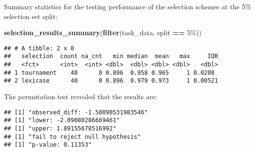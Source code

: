 \documentclass[
]{book}
\newenvironment{Shaded}{\begin{snugshade}}{\end{snugshade}}
\newcommand{\AttributeTok}[1]{\textcolor[rgb]{0.13,0.29,0.53}{#1}}
\newcommand{\DecValTok}[1]{\textcolor[rgb]{0.00,0.00,0.81}{#1}}
\newcommand{\FunctionTok}[1]{\textcolor[rgb]{0.13,0.29,0.53}{\textbf{#1}}}
\newcommand{\NormalTok}[1]{#1}
\newcommand{\OtherTok}[1]{\textcolor[rgb]{0.56,0.35,0.01}{#1}}
\newcommand{\SpecialCharTok}[1]{\textcolor[rgb]{0.81,0.36,0.00}{\textbf{#1}}}
\newcommand{\StringTok}[1]{\textcolor[rgb]{0.31,0.60,0.02}{#1}}
\begin{document}
Summary statistics for the testing performance of the selection schemes at the 5\% selection set split:

\begin{Shaded}
\begin{Highlighting}[]
\FunctionTok{selection\_results\_summary}\NormalTok{(}\FunctionTok{filter}\NormalTok{(task\_data, split }\SpecialCharTok{==} \StringTok{\textquotesingle{}5\%\textquotesingle{}}\NormalTok{))}
\end{Highlighting}
\end{Shaded}

\begin{verbatim}
## # A tibble: 2 x 8
##   selection  count na_cnt   min median  mean   max     IQR
##   <fct>      <int>  <int> <dbl>  <dbl> <dbl> <dbl>   <dbl>
## 1 tournament    40      0 0.896  0.958 0.965     1 0.0208 
## 2 lexicase      40      0 0.896  0.979 0.973     1 0.00521
\end{verbatim}

The permutation test revealed that the results are:

\begin{Shaded}
\end{Shaded}

\begin{verbatim}
## [1] "observed_diff: -1.50090531983546"
## [1] "lower: -2.09080286669461"
## [1] "upper: 1.89155678516992"
## [1] "fail to reject null hypothesis"
## [1] "p-value: 0.11353"
\end{verbatim}
\end{document}

